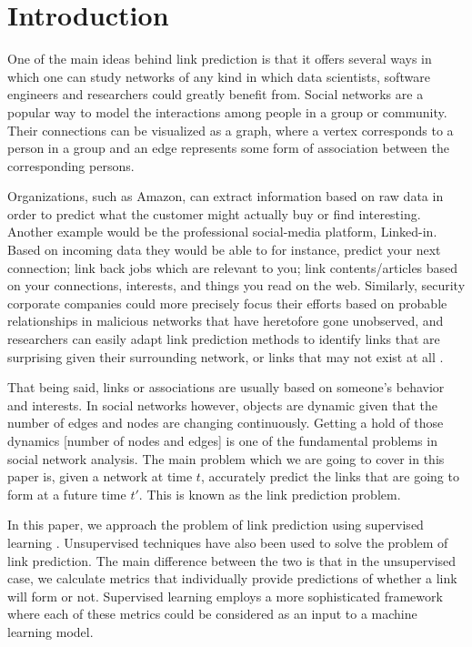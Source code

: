 \documentclass{acm_proc_article-sp}
\begin{document}


\section{Introduction}
\label{Sect.1}

One of the main ideas behind link prediction is that it offers several ways in which one can study networks of any kind in which data scientists, software engineers and researchers could greatly benefit from. Social networks are a popular way to model the interactions among people in a group or community. Their connections can be visualized as a graph, where a vertex corresponds to a person in a group and an edge represents some form of association between the corresponding persons.

Organizations, such as Amazon, can extract information based on raw data in order to predict what the customer might actually buy or find interesting. Another example would be the professional social-media platform, Linked-in.  Based on incoming data they would be able to for instance, predict your next connection; link back jobs which are relevant to you; link contents/articles based on your connections, interests, and things you read on the web. Similarly, security corporate companies could more precisely focus their efforts based on probable relationships in malicious networks that have heretofore gone unobserved, and researchers can easily adapt link prediction methods to identify links that are surprising given their surrounding network, or links that may not exist at all \cite{Lichtenwalter:2010:NPM:1835804.1835837}. 

That being said, links or associations are usually based on someone's behavior and interests. In social networks however, objects are dynamic given that the number of edges and nodes are changing continuously. Getting a hold of those dynamics [number of nodes and edges] is one of the fundamental problems in social network analysis. The main problem which we are going to cover in this paper is, given a network at time $t$, accurately predict the links that are going to form at a future time $t'$. This is known as the link prediction problem.

In this paper, we approach the problem of link prediction using supervised learning \cite{Fire2013, Hasan06linkprediction, Lichtenwalter:2010:NPM:1835804.1835837, Wang:2007:LPM:1441428.1442084}. Unsupervised techniques have also been used to solve the problem of link prediction. The main difference between the two is that in the unsupervised case, we calculate metrics that individually provide predictions of whether a link will form or not. Supervised learning employs a more sophisticated framework where each of these metrics could be considered as an input to a machine learning model.
\end{document}
